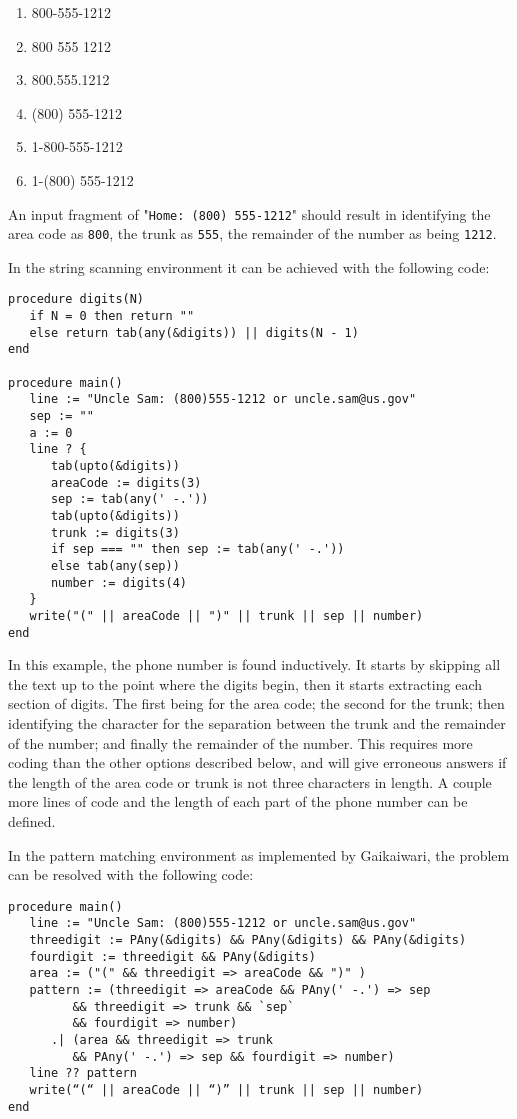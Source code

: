 \documentclass{article}
\begin{document}
\begin{enumerate}
\item 800-555-1212
\item 800 555 1212
\item 800.555.1212
\item (800) 555-1212
\item 1-800-555-1212
\item 1-(800) 555-1212
\end{enumerate}

An input fragment of "\texttt{Home: (800) 555-1212}" should result in identifying the area code as \texttt{800}, the trunk as \texttt{555}, the remainder of the number as being \texttt{1212}.

In the string scanning environment it can be achieved with the following code:
\begin{verbatim}
procedure digits(N)
   if N = 0 then return ""
   else return tab(any(&digits)) || digits(N - 1)
end

procedure main()
   line := "Uncle Sam: (800)555-1212 or uncle.sam@us.gov"
   sep := ""
   a := 0
   line ? {
      tab(upto(&digits))
      areaCode := digits(3)
      sep := tab(any(' -.'))
      tab(upto(&digits))
      trunk := digits(3)
      if sep === "" then sep := tab(any(' -.'))
      else tab(any(sep))
      number := digits(4)
   }
   write("(" || areaCode || ")" || trunk || sep || number)
end
\end{verbatim}
In this example, the phone number is found inductively.  It starts by skipping all the text up to the point where the digits begin, then it starts extracting each section of digits.  The first being for the area code; the second for the trunk; then identifying the character for the separation between the trunk and the remainder of the number; and finally the remainder of the number.  This requires more coding than the other options described below, and will give erroneous answers if the length of the area code or trunk is not three characters in length.  A couple more lines of code and the length of each part of the phone number can be defined.

In the pattern matching environment as implemented by Gaikaiwari, the problem can be resolved with the following code:
\begin{verbatim}
procedure main()
   line := "Uncle Sam: (800)555-1212 or uncle.sam@us.gov"
   threedigit := PAny(&digits) && PAny(&digits) && PAny(&digits)
   fourdigit := threedigit && PAny(&digits)
   area := ("(" && threedigit => areaCode && ")" )
   pattern := (threedigit => areaCode && PAny(' -.') => sep
         && threedigit => trunk && `sep`
         && fourdigit => number)
      .| (area && threedigit => trunk
         && PAny(' -.') => sep && fourdigit => number)
   line ?? pattern
   write(“(“ || areaCode || “)” || trunk || sep || number) 
end
\end{verbatim}
\end{document}
